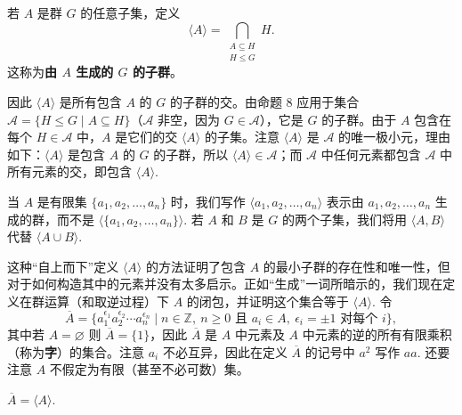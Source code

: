 \begin{definition}
若 \(A\) 是群 \(G\) 的任意子集，定义
\[
\langle A \rangle = \bigcap_{\substack{A \subseteq H \\ H \leq G}} H.
\]
这称为\textbf{由 \(A\) 生成的 \(G\) 的子群}。
\end{definition}

因此 \(\langle A \rangle\) 是所有包含 \(A\) 的 \(G\) 的子群的交。由命题 8 应用于集合 \(\mathcal{A} = \{H \leq G \mid A \subseteq H\}\)（\(\mathcal{A}\) 非空，因为 \(G \in \mathcal{A}\)），它是 \(G\) 的子群。由于 \(A\) 包含在每个 \(H \in \mathcal{A}\) 中，\(A\) 是它们的交 \(\langle A \rangle\) 的子集。注意 \(\langle A \rangle\) 是 \(\mathcal{A}\) 的唯一极小元，理由如下：\(\langle A \rangle\) 是包含 \(A\) 的 \(G\) 的子群，所以 \(\langle A \rangle \in \mathcal{A}\)；而 \(\mathcal{A}\) 中任何元素都包含 \(\mathcal{A}\) 中所有元素的交，即包含 \(\langle A \rangle\).

当 \(A\) 是有限集 \(\{a_1, a_2, \ldots, a_n\}\) 时，我们写作 \(\langle a_1, a_2, \ldots, a_n \rangle\) 表示由 \(a_1, a_2, \ldots, a_n\) 生成的群，而不是 \(\langle \{a_1, a_2, \ldots, a_n\} \rangle\). 若 \(A\) 和 \(B\) 是 \(G\) 的两个子集，我们将用 \(\langle A, B \rangle\) 代替 \(\langle A \cup B \rangle\).

这种“自上而下”定义 \(\langle A \rangle\) 的方法证明了包含 \(A\) 的最小子群的存在性和唯一性，但对于如何构造其中的元素并没有太多启示。正如“生成”一词所暗示的，我们现在定义在群运算（和取逆过程）下 \(A\) 的闭包，并证明这个集合等于 \(\langle A \rangle\). 令
\[
\overline{A} = \{a_1^{\epsilon_1} a_2^{\epsilon_2} \cdots a_n^{\epsilon_n} \mid n \in \mathbb{Z},\ n \geq 0 \text{ 且 } a_i \in A,\ \epsilon_i = \pm 1 \text{ 对每个 } i\},
\]
其中若 \(A = \varnothing\) 则 \(\overline{A} = \{1\}\)，因此 \(\overline{A}\) 是 \(A\) 中元素及 \(A\) 中元素的逆的所有有限乘积（称为\textbf{字}）的集合。注意 \(a_i\) 不必互异，因此在定义 \(\overline{A}\) 的记号中 \(a^2\) 写作 \(aa\). 还要注意 \(A\) 不假定为有限（甚至不必可数）集。

\begin{proposition}
\(\overline{A} = \langle A \rangle\).
\end{proposition}

